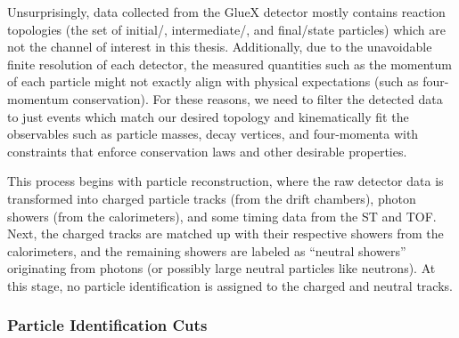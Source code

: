 Unsurprisingly, data collected from the GlueX detector mostly contains reaction topologies (the set of initial\-/, intermediate\-/, and final\-/state particles) which are not the channel of interest in this thesis. Additionally, due to the unavoidable finite resolution of each detector, the measured quantities such as the momentum of each particle might not exactly align with physical expectations (such as four-momentum conservation). For these reasons, we need to filter the detected data to just events which match our desired topology and kinematically fit the observables such as particle masses, decay vertices, and four-momenta with constraints that enforce conservation laws and other desirable properties.

This process begins with particle reconstruction, where the raw detector data is transformed into charged particle tracks (from the drift chambers), photon showers (from the calorimeters), and some timing data from the ST and TOF. Next, the charged tracks are matched up with their respective showers from the calorimeters, and the remaining showers are labeled as ``neutral showers'' originating from photons (or possibly large neutral particles like neutrons). At this stage, no particle identification is assigned to the charged and neutral tracks.

\subsubsection{Particle Identification Cuts}

